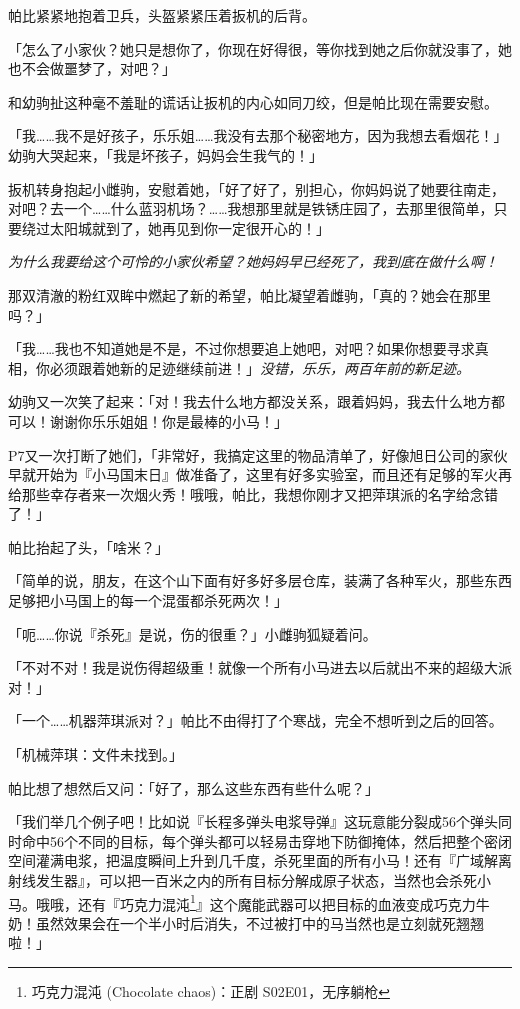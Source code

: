 \medskip


帕比紧紧地抱着卫兵，头盔紧紧压着扳机的后背。

「怎么了小家伙？她只是想你了，你现在好得很，等你找到她之后你就没事了，她也不会做噩梦了，对吧？」

和幼驹扯这种毫不羞耻的谎话让扳机的内心如同刀绞，但是帕比现在需要安慰。

「我……我不是好孩子，乐乐姐……我没有去那个秘密地方，因为我想去看烟花！」幼驹大哭起来，「我是坏孩子，妈妈会生我气的！」

扳机转身抱起小雌驹，安慰着她，「好了好了，别担心，你妈妈说了她要往南走，对吧？去一个……什么蓝羽机场？……我想那里就是铁锈庄园了，去那里很简单，只要绕过太阳城就到了，她再见到你一定很开心的！」

\emph{为什么我要给这个可怜的小家伙希望？她妈妈早已经死了，我到底在做什么啊！}

那双清澈的粉红双眸中燃起了新的希望，帕比凝望着雌驹，「真的？她会在那里吗？」

「我……我也不知道她是不是，不过你想要追上她吧，对吧？如果你想要寻求真相，你必须跟着她新的足迹继续前进！」\emph{没错，乐乐，两百年前的新足迹。}

幼驹又一次笑了起来：「对！我去什么地方都没关系，跟着妈妈，我去什么地方都可以！谢谢你乐乐姐姐！你是最棒的小马！」

P7又一次打断了她们，「非常好，我搞定这里的物品清单了，好像旭日公司的家伙早就开始为『小马国末日』做准备了，这里有好多实验室，而且还有足够的军火再给那些幸存者来一次烟火秀！哦哦，帕比，我想你刚才又把萍琪派的名字给念错了！」

帕比抬起了头，「啥米？」

「简单的说，朋友，在这个山下面有好多好多层仓库，装满了各种军火，那些东西足够把小马国上的每一个混蛋都杀死两次！」

「呃……你说『杀死』是说，伤的很重？」小雌驹狐疑着问。

「不对不对！我是说伤得超级重！就像一个所有小马进去以后就出不来的超级大派对！」

「一个……机器萍琪派对？」帕比不由得打了个寒战，完全不想听到之后的回答。

「机械萍琪：文件未找到。」

帕比想了想然后又问：「好了，那么这些东西有些什么呢？」

「我们举几个例子吧！比如说『长程多弹头电浆导弹』这玩意能分裂成56个弹头同时命中56个不同的目标，每个弹头都可以轻易击穿地下防御掩体，然后把整个密闭空间灌满电浆，把温度瞬间上升到几千度，杀死里面的所有小马！还有『广域解离射线发生器』，可以把一百米之内的所有目标分解成原子状态，当然也会杀死小马。哦哦，还有『巧克力混沌\footnote{巧克力混沌 (Chocolate chaos)：正剧 S02E01，无序躺枪}』这个魔能武器可以把目标的血液变成巧克力牛奶！虽然效果会在一个半小时后消失，不过被打中的马当然也是立刻就死翘翘啦！」

